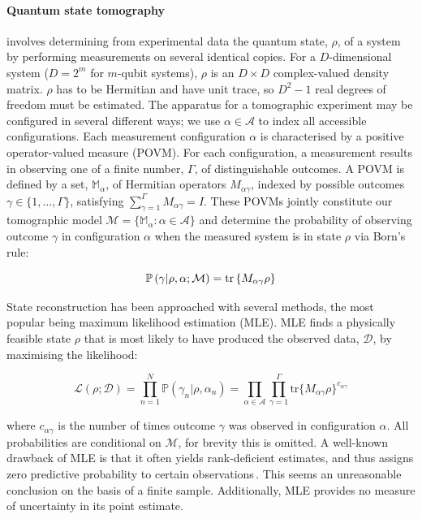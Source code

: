 \documentclass[aps,twocolumn,prl]{revtex4-1}
\newcommand{\param}{{\rho}} \newcommand{\data}{\mathcal{D}}
\newcommand{\config}{\alpha} \newcommand{\configset}{\mathcal{A}}
\newcommand{\outcome}{\gamma} \newcommand{\ie}{i.\,e.\ }
\begin{document}
\paragraph{Quantum state tomography} involves determining from experimental data the quantum state, $\rho$, of a system by performing measurements on several identical copies. For a $D$-dimensional system ($D=2^m$ for $m$-qubit systems), $\rho$ is an $D \times D$ complex-valued density matrix. $\rho$ has to be Hermitian and have unit trace, so $D^2-1$ real degrees of freedom must be estimated. The apparatus for a tomographic experiment may be configured in several different ways; we use $\config\in\configset$ to index all accessible configurations. Each measurement configuration $\config$ is characterised by a positive operator-valued measure (POVM). For each configuration, a measurement results in observing one of a finite number, $\Gamma$, of distinguishable outcomes. A POVM is defined by a set, $\mathbb{M}_{\config}$, of Hermitian operators $M_{\config\outcome}$, indexed by possible outcomes $\outcome\in\{1,\ldots,\Gamma\}$, satisfying $\sum_{\outcome=1}^{\Gamma} M_{\config\outcome} = I$. These POVMs jointly constitute our tomographic model $\mathcal{M}=\{\mathbb{M}_{\config}:\config\in\configset\}$ and determine the probability of observing outcome $\outcome$ in configuration $\config$ when the measured system is in state $\param$ via Born's rule:

\begin{equation}
\mathbb{P}\left(\gamma\vert\param,\config;\mathcal{M}\right) = \text{tr}\left\{M_{\config\outcome}\param \right\}\label{eqn:born}\notag
\end{equation}

State reconstruction has been approached with several methods, the most popular being maximum likelihood estimation (MLE). MLE finds a physically feasible state $\param$ that is most likely to have produced the observed data, $\mathcal{D}$, by maximising the likelihood:

\begin{equation}
\label{eqn:lik}
\mathcal{L}(\rho;\data)=\prod_{n=1}^{N} \mathbb{P}\left(\outcome_n\vert\param,\config_n\right) = \prod_{\config\in\configset}\prod_{\gamma=1}^{\Gamma}\mbox{tr}\{M_{\alpha\gamma}\rho\}^{c_{\alpha\gamma}}
\end{equation}

where $c_{\alpha\gamma}$ is the number of times outcome $\outcome$ was observed in configuration $\config$. 
All probabilities are conditional on $\mathcal{M}$, for brevity this is omitted. A well-known drawback of MLE is that it often yields rank-deficient estimates, and thus assigns zero predictive probability to certain observations\,\cite{BayesianTomography}. This seems an unreasonable conclusion on the basis of a finite sample.
Additionally, MLE provides no measure of uncertainty in its point estimate.
\end{document}
